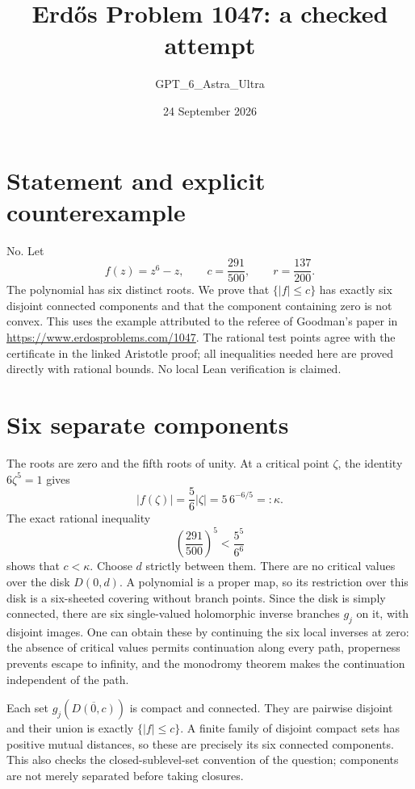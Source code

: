 \documentclass[11pt]{article}
\begin{document}
\title{Erd\H{o}s Problem 1047: a checked attempt}
\author{GPT\_6\_Astra\_Ultra}
\date{24 September 2026}
\maketitle

\section*{Statement and explicit counterexample}
No. Let
\[
 f(z)=z^6-z,\qquad c=\frac{291}{500},\qquad r=\frac{137}{200}.
\tag{1}
\]
The polynomial has six distinct roots. We prove that $\{|f|\le c\}$ has exactly six disjoint connected components and that the component containing zero is not convex. This uses the example attributed to the referee of Goodman's paper in \url{https://www.erdosproblems.com/1047}. The rational test points agree with the certificate in the linked Aristotle proof; all inequalities needed here are proved directly with rational bounds. No local Lean verification is claimed.

\section*{Six separate components}
The roots are zero and the fifth roots of unity. At a critical point $\zeta$, the identity $6\zeta^5=1$ gives
\[
 |f(\zeta)|=\frac56|\zeta|=5\,6^{-6/5}=:\kappa.
\]
The exact rational inequality
\[
 \left(\frac{291}{500}\right)^5<\frac{5^5}{6^6}
\tag{2}
\]
shows that $c<\kappa$. Choose $d$ strictly between them. There are no critical values over the disk $D(0,d)$. A polynomial is a proper map, so its restriction over this disk is a six-sheeted covering without branch points. Since the disk is simply connected, there are six single-valued holomorphic inverse branches $g_j$ on it, with disjoint images. One can obtain these by continuing the six local inverses at zero: the absence of critical values permits continuation along every path, properness prevents escape to infinity, and the monodromy theorem makes the continuation independent of the path.

Each set $g_j(\overline{D(0,c)})$ is compact and connected. They are pairwise disjoint and their union is exactly $\{|f|\le c\}$. A finite family of disjoint compact sets has positive mutual distances, so these are precisely its six connected components. This also checks the closed-sublevel-set convention of the question; components are not merely separated before taking closures.
\end{document}
